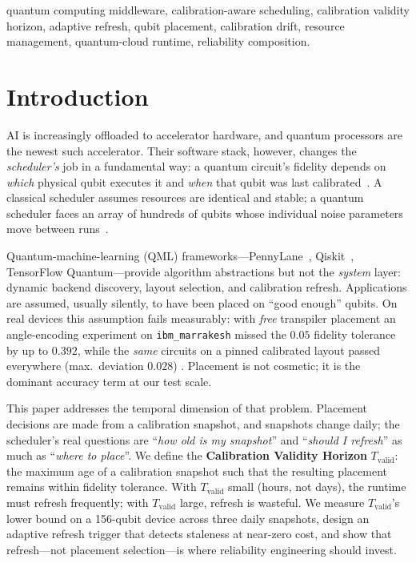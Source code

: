 \documentclass[journal,10pt,twocolumn]{IEEEtran}
\begin{document}
\begin{IEEEkeywords}
quantum computing middleware, calibration-aware scheduling, calibration validity horizon, adaptive refresh,
qubit placement, calibration drift, resource management, quantum-cloud runtime, reliability composition.
\end{IEEEkeywords}

\section{Introduction}
 AI is increasingly offloaded to accelerator hardware, and quantum processors are the
newest such accelerator. Their software stack, however, changes the \emph{scheduler's} job in a fundamental way: a
quantum circuit's fidelity depends on \emph{which} physical qubit executes it and \emph{when} that qubit was last
calibrated~\cite{preskill2018,arute2019,murali2019noise,li2019sabre}. A classical scheduler assumes resources are
identical and stable; a quantum scheduler faces an array of hundreds of qubits whose individual noise parameters
move between runs~\cite{ibmcalib,kanazawa2021,vanberg2023}.

Quantum-machine-learning (QML) frameworks---PennyLane~\cite{berholm2018}, Qiskit~\cite{qiskit}, TensorFlow
Quantum---provide algorithm abstractions but not the \emph{system} layer: dynamic backend discovery, layout
selection, and calibration refresh. Applications are assumed, usually silently, to have been placed on ``good
enough'' qubits. On real devices this assumption fails measurably: with \emph{free} transpiler placement an
angle-encoding experiment on \texttt{ibm\_marrakesh} missed the $0.05$ fidelity tolerance by up to $0.392$,
while the \emph{same} circuits on a pinned calibrated layout passed everywhere (max.\ deviation $0.028$)
\cite{tangpu}. Placement is not cosmetic; it is the dominant accuracy term at our test scale.

This paper addresses the temporal dimension of that problem. Placement decisions are made from a calibration
snapshot, and snapshots change daily; the scheduler's real questions are ``\emph{how old is my snapshot}'' and
``\emph{should I refresh}'' as much as ``\emph{where to place}''. We define the \textbf{Calibration Validity
Horizon} $T_{\mathrm{valid}}$: the maximum age of a calibration snapshot such that the resulting placement
remains within fidelity tolerance. With $T_{\mathrm{valid}}$ small (hours, not days), the runtime must refresh
frequently; with $T_{\mathrm{valid}}$ large, refresh is wasteful. We measure $T_{\mathrm{valid}}$'s lower bound
on a 156-qubit device across three daily snapshots, design an adaptive refresh trigger that detects staleness at
near-zero cost, and show that refresh---not placement selection---is where reliability engineering should invest.
\end{document}
